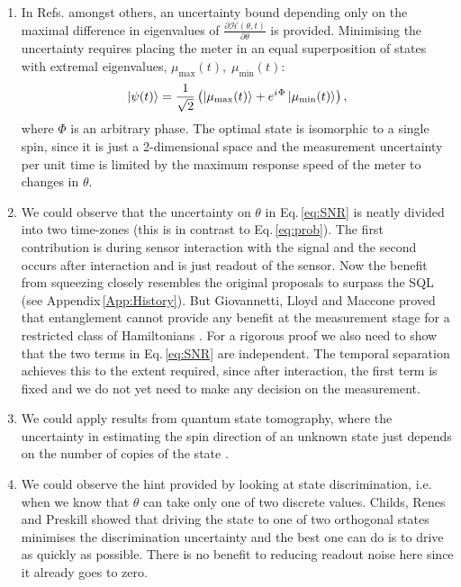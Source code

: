 \documentclass[reqno]{amsart}
\newcommand{\ket}[1]{\left| #1 \right>}
\newcommand{\hham}{\mathcal{H}}
\newcommand{\iu}{{i\mkern1mu}}
\begin{document}
\begin{enumerate}
\item In Refs. \cite{Wootters1981, Braunstein1994, Childs2000, Giovannetti2006, Jones2010, Pang2017} amongst others, an uncertainty bound depending only on the maximal difference in eigenvalues of $\frac{\partial \hham(\theta,t)}{\partial \theta}$ is provided. Minimising the uncertainty requires placing the meter in an equal superposition of states with extremal eigenvalues, $\mu_{\mathrm{max}}(t), \; \mu_{\mathrm{min}}(t)$:
\[
\ket{\psi(t)} = \frac{1}{\sqrt{2}}\left(\ket{\mu_{\mathrm{max}}(t)} + e^{\iu \Phi}\ket{\mu_{\mathrm{min}}(t)}\right),
\]
where $\Phi$ is an arbitrary phase. The optimal state is isomorphic to a single spin, since it is just a 2-dimensional space and the measurement uncertainty per unit time is limited by the maximum response speed of the meter to changes in $\theta$.

\item We could observe that the uncertainty on $\theta$ in Eq.\,\eqref{eq:SNR} is neatly divided into two time-zones (this is in contrast to Eq.\,\eqref{eq:prob}). The first contribution is during sensor interaction with the signal and the second occurs after interaction and is just readout of the sensor. Now the benefit from squeezing closely resembles the original proposals to surpass the SQL (see Appendix\,\ref{App:History}). But Giovannetti, Lloyd and Maccone proved that entanglement cannot provide any benefit at the measurement stage for a restricted class of Hamiltonians \cite{Giovannetti2006}. For a rigorous proof we also need to show that the two terms in Eq.\,\eqref{eq:SNR} are independent. The temporal separation achieves this to the extent required, since after interaction, the first term is fixed and we do not yet need to make any decision on the measurement.

\item We could apply results from quantum state tomography, where the uncertainty in estimating the spin direction of an unknown state just depends on the number of copies of the state \cite{ODonnell2016, Aaronson2018}.

\item We could observe the hint provided by looking at state discrimination, i.e. when we know that $\theta$ can take only one of two discrete values. Childs, Renes and Preskill \cite{Childs2000} showed that driving the state to one of two orthogonal states minimises the discrimination uncertainty and the best one can do is to drive as quickly as possible. There is no benefit to reducing readout noise here since it already goes to zero.\\
\end{enumerate}
\end{document}
